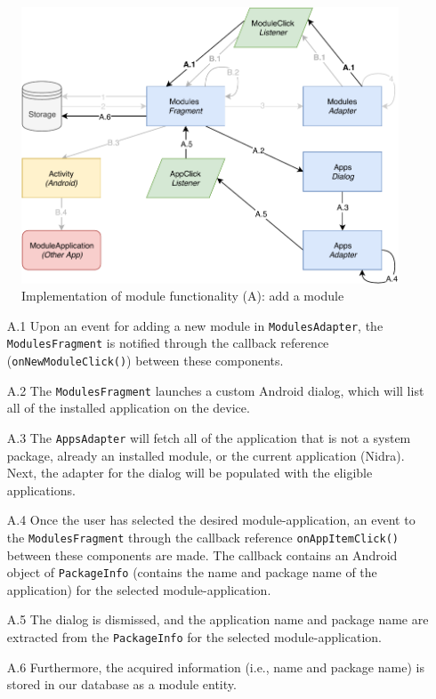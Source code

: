 \begin{figure}
    \centering
    \includegraphics[scale=0.7]{images/Module_ImpA.pdf}
    \caption{Implementation of module functionality (A): add a module}
    \label{fig:impl_modulesA}
\end{figure}

\begin{itemize}
    \item[A.1] Upon an event for adding a new module in \verb|ModulesAdapter|, the \verb|ModulesFragment| is notified through the callback reference (\verb|onNewModuleClick()|) between these components.
    \item[A.2] The \verb|ModulesFragment| launches a custom Android dialog, which will list all of the installed application on the device. 
    \item[A.3] The \verb|AppsAdapter| will fetch all of the application that is not a system package, already an installed module, or the current application (Nidra). Next, the adapter for the dialog will be populated with the eligible applications. 
    \item[A.4] Once the user has selected the desired module-application, an event to the \verb|ModulesFragment| through the callback reference \verb|onAppItemClick()| between these components are made. The callback contains an Android object of \verb|PackageInfo| (contains the name and package name of the application) for the selected module-application.
    \item[A.5] The dialog is dismissed, and the application name and package name are extracted from the \verb|PackageInfo| for the selected module-application. 
    \item[A.6] Furthermore, the acquired information (i.e., name and package name) is stored in our database as a module entity. 
\end{itemize}

